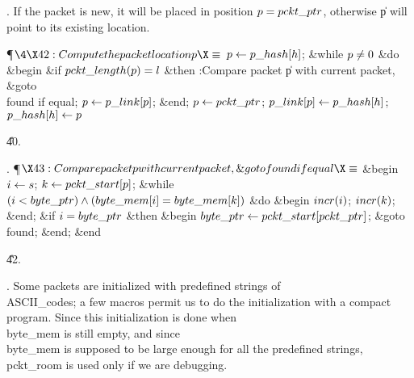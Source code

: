 . If the packet is new, it will be placed in position $\|p=\\{pckt\_ptr}$,
otherwise \|p will point to its existing location.

\Y\P$\4\X42:Compute the packet location \|p\X\S$\6
$\|p\K\\{p\_hash}[\|h]$;\6
\&{while} $\|p\I0$ \1\&{do}\6
\&{begin} \&{if} $\\{pckt\_length}(\|p)=\|l$ \1\&{then}\5
:Compare packet \|p with current packet, \&{goto} \\{found} if equal\X;\2\6
$\|p\K\\{p\_link}[\|p]$;\6
\&{end};\2\6
$\|p\K\\{pckt\_ptr}$;\6
$\\{p\_link}[\|p]\K\\{p\_hash}[\|h]$;\5
$\\{p\_hash}[\|h]\K\|p$\par
\U40.\fi

. \P$\X43:Compare packet \|p with current packet, \&{goto} \\{found} if
equal\X\S$\6
\&{begin} $\|i\K\|s$;\5
$\|k\K\\{pckt\_start}[\|p]$;\6
\&{while} $(\|i<\\{byte\_ptr})\W(\\{byte\_mem}[\|i]=\\{byte\_mem}[\|k])$ \1%
\&{do}\6
\&{begin} $\\{incr}(\|i)$;\5
$\\{incr}(\|k)$;\6
\&{end};\2\6
\&{if} $\|i=\\{byte\_ptr}$ \1\&{then}\6
\&{begin} $\\{byte\_ptr}\K\\{pckt\_start}[\\{pckt\_ptr}]$;\5
\&{goto} \\{found};\6
\&{end};\2\6
\&{end}\par
\U42.\fi

. Some packets are initialized with predefined strings of \\{ASCII\_code}s;
a few macros permit us to do the initialization with a compact program.
Since this initialization is done when \\{byte\_mem} is still empty, and
since \\{byte\_mem} is supposed to be large enough for all the predefined
strings, \\{pckt\_room} is used only if we are debugging.

